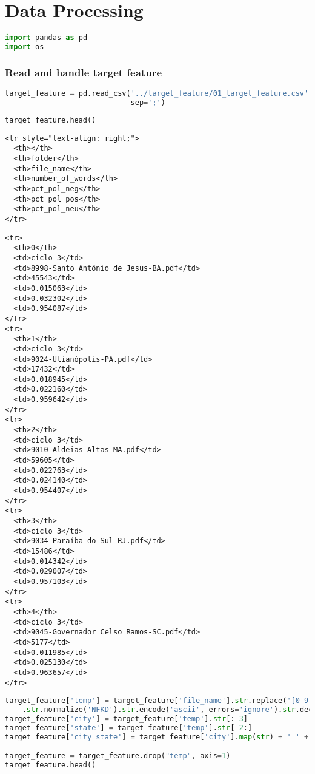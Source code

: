 \section{Data Processing}\label{data-processing}

\begin{lstlisting}[language=Python]
import pandas as pd
import os
\end{lstlisting}

\subsubsection{Read and handle target
feature}\label{read-and-handle-target-feature}

\begin{lstlisting}[language=Python]
target_feature = pd.read_csv('../target_feature/01_target_feature.csv',
                             sep=';')
\end{lstlisting}

\begin{lstlisting}[language=Python]
target_feature.head()
\end{lstlisting}

\begin{lstlisting}
<tr style="text-align: right;">
  <th></th>
  <th>folder</th>
  <th>file_name</th>
  <th>number_of_words</th>
  <th>pct_pol_neg</th>
  <th>pct_pol_pos</th>
  <th>pct_pol_neu</th>
</tr>
\end{lstlisting}

\begin{lstlisting}
<tr>
  <th>0</th>
  <td>ciclo_3</td>
  <td>8998-Santo Antônio de Jesus-BA.pdf</td>
  <td>45543</td>
  <td>0.015063</td>
  <td>0.032302</td>
  <td>0.954087</td>
</tr>
<tr>
  <th>1</th>
  <td>ciclo_3</td>
  <td>9024-Ulianópolis-PA.pdf</td>
  <td>17432</td>
  <td>0.018945</td>
  <td>0.022160</td>
  <td>0.959642</td>
</tr>
<tr>
  <th>2</th>
  <td>ciclo_3</td>
  <td>9010-Aldeias Altas-MA.pdf</td>
  <td>59605</td>
  <td>0.022763</td>
  <td>0.024140</td>
  <td>0.954407</td>
</tr>
<tr>
  <th>3</th>
  <td>ciclo_3</td>
  <td>9034-Paraíba do Sul-RJ.pdf</td>
  <td>15486</td>
  <td>0.014342</td>
  <td>0.029007</td>
  <td>0.957103</td>
</tr>
<tr>
  <th>4</th>
  <td>ciclo_3</td>
  <td>9045-Governador Celso Ramos-SC.pdf</td>
  <td>5177</td>
  <td>0.011985</td>
  <td>0.025130</td>
  <td>0.963657</td>
</tr>
\end{lstlisting}

\begin{lstlisting}[language=Python]
target_feature['temp'] = target_feature['file_name'].str.replace('[0-9]|.pdf|-', ' ', regex=True)\
    .str.normalize('NFKD').str.encode('ascii', errors='ignore').str.decode('utf-8').str.lower().str.strip()
target_feature['city'] = target_feature['temp'].str[:-3]
target_feature['state'] = target_feature['temp'].str[-2:]
target_feature['city_state'] = target_feature['city'].map(str) + '_' + target_feature['state']

target_feature = target_feature.drop("temp", axis=1)
target_feature.head()
\end{lstlisting}

